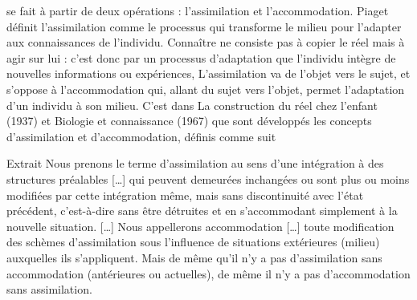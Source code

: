 se fait à partir de deux opérations : l'assimilation et l’accommodation.
Piaget définit l'assimilation comme le processus qui transforme le milieu pour l'adapter aux
connaissances de l'individu. Connaître ne consiste pas à copier le réel mais à agir sur lui :
c’est donc par un processus d'adaptation que l'individu intègre de nouvelles informations ou
expériences, L'assimilation va de l'objet vers le sujet, et s'oppose à l'accommodation qui, allant du
sujet vers l'objet, permet l'adaptation d'un individu à son milieu.
C'est dans La construction du réel chez l'enfant (1937) et Biologie et connaissance (1967) que
sont développés les concepts d'assimilation et d'accommodation, définis comme suit
\begin{lecture}{Extrait}
Nous prenons le terme d'assimilation au sens d'une intégration à des structures préalables […] qui peuvent demeurées inchangées ou sont plus ou moins modifiées par cette intégration même, mais sans discontinuité avec l'état précédent, c'est-à-dire sans être détruites et en s'accommodant simplement à la nouvelle situation. […] Nous appellerons accommodation […] toute modification des schèmes d'assimilation sous l'influence de situations extérieures (milieu) auxquelles ils s'appliquent. Mais de même qu'il n'y a pas d'assimilation sans accommodation (antérieures ou actuelles), de même il n'y a pas d'accommodation sans assimilation.
\end{lecture}

